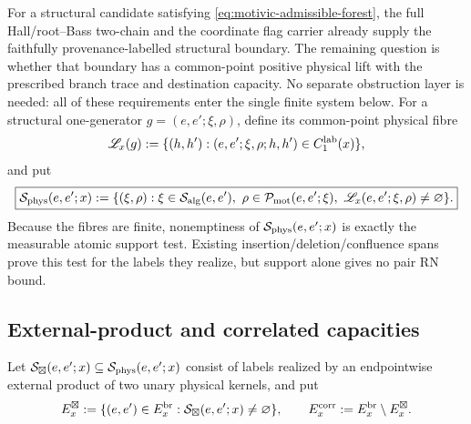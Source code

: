 \documentclass[11pt]{article}
\begin{document}
For a structural candidate satisfying
\eqref{eq:motivic-admissible-forest}, the full Hall/root--Bass two-chain and the
coordinate flag carrier already supply the faithfully provenance-labelled
structural boundary.  The remaining question is whether that boundary has a
common-point positive physical lift with the prescribed branch trace and
destination capacity.  No separate obstruction layer is needed: all of these
requirements enter the single finite system below.  For a structural one-generator
\(g=(e,e';\xi,\rho)\), define its common-point physical fibre
\[
 \mathscr L_x(g)
 :=
 \{(h,h'):(e,e';\xi,\rho;h,h')
             \in C_1^{\rm lab}(x)\},
\]
and put
\begin{equation}\label{eq:physical-pair-support}
 \boxed{
 \mathcal S_{\rm phys}(e,e';x)
 :=
 \{(\xi,\rho):
   \xi\in\mathcal S_{\rm alg}(e,e'),\
   \rho\in\mathcal P_{\rm mot}(e,e';\xi),\
   \mathscr L_x(e,e';\xi,\rho)\ne\varnothing\}.}
\end{equation}
Because the fibres are finite, nonemptiness of
\(\mathcal S_{\rm phys}(e,e';x)\) is exactly the measurable atomic support
test.  Existing insertion/deletion/confluence spans prove this test for the
labels they realize, but support alone gives no pair RN bound.

\subsection{External-product and correlated capacities}

Let
\(\mathcal S_{\boxtimes}(e,e';x)\subseteq
\mathcal S_{\rm phys}(e,e';x)\) consist of labels realized by an endpointwise
external product of two unary physical kernels, and put
\[
 E_x^{\boxtimes}
 :=\{(e,e')\in E_x^{\rm br}:
       \mathcal S_{\boxtimes}(e,e';x)\ne\varnothing\},
 \qquad
 E_x^{\rm corr}:=E_x^{\rm br}\setminus E_x^{\boxtimes}.
\]
\end{document}
